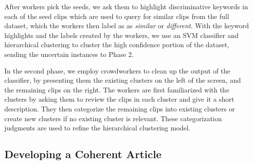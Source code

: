 After workers pick the seeds, we ask them to highlight discriminative keywords in each of the seed clips which are used to query for similar clips from the full dataset, which the workers then label as as \textit{similar} or \textit{different}. With the keyword highlights and the labels created by the workers, we use an SVM classifier and hierarchical clustering to cluster the high confidence portion of the dataset, sending the uncertain instances to Phase 2. 


In the second phase, we employ crowdworkers to clean up the output of the classifier, by presenting them the existing clusters on the left of the screen, and the remaining clips on the right. The workers are first familiarized with the clusters by asking them to review the clips in each cluster and give it a short description. They then categorize the remaining clips into existing clusters or create new clusters if no existing cluster is relevant. These categorization judgments are used to refine the hierarchical clustering model.


\subsection{Developing a Coherent Article}



